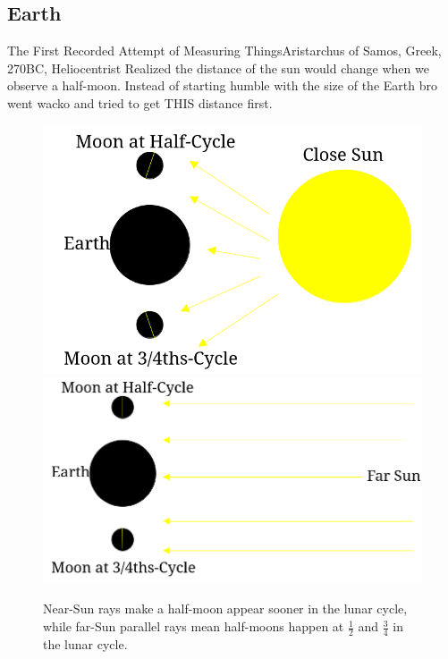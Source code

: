 \documentclass[12pt]{beamer}
\begin{document}
    \subsection{Earth}
        \begin{frame}{The First Recorded Attempt of Measuring Things}{Aristarchus of Samos, Greek, 270BC, Heliocentrist}
            Realized the distance of the sun would change when we observe a half-moon. Instead of starting humble with the size of the Earth bro went wacko and tried to get THIS distance first.
            \begin{figure}
                \includegraphics[scale=0.19, frame]{nearsun.png}
                \includegraphics[scale=0.19, frame]{farsun.png}
                \caption{Near-Sun rays make a half-moon appear sooner in the lunar cycle, while far-Sun parallel rays mean half-moons happen at $\frac{1}{2}$ and $\frac{3}{4}$ in the lunar cycle.}
            \end{figure}
        \end{frame}
\end{document}
